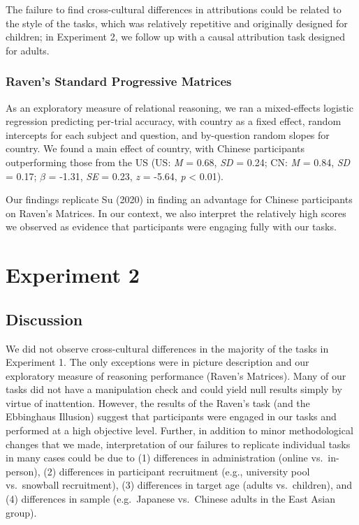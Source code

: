 \documentclass[
  man,floatsintext]{apa6}
\begin{document}
The failure to find cross-cultural differences in attributions could be related to the style of the tasks, which was relatively repetitive and originally designed for children; in Experiment 2, we follow up with a causal attribution task designed for adults.

\hypertarget{ravens-standard-progressive-matrices-1}{%
\subsubsection{Raven's Standard Progressive Matrices}\label{ravens-standard-progressive-matrices-1}}

As an exploratory measure of relational reasoning, we ran a mixed-effects logistic regression predicting per-trial accuracy, with country as a fixed effect, random intercepts for each subject and question, and by-question random slopes for country. We found a main effect of country, with Chinese participants outperforming those from the US (US: \emph{M} = 0.68, \emph{SD} = 0.24; CN: \emph{M} = 0.84, \emph{SD} = 0.17; \(\beta\) = -1.31, \emph{SE} = 0.23, \emph{z} = -5.64, \emph{p} \textless{} 0.01).

Our findings replicate Su (2020) in finding an advantage for Chinese participants on Raven's Matrices. In our context, we also interpret the relatively high scores we observed as evidence that participants were engaging fully with our tasks.

\hypertarget{experiment-2}{%
\section{Experiment 2}\label{experiment-2}}

\hypertarget{discussion}{%
\subsection{Discussion}\label{discussion}}

We did not observe cross-cultural differences in the majority of the tasks in Experiment 1. The only exceptions were in picture description and our exploratory measure of reasoning performance (Raven's Matrices). Many of our tasks did not have a manipulation check and could yield null results simply by virtue of inattention. However, the results of the Raven's task (and the Ebbinghaus Illusion) suggest that participants were engaged in our tasks and performed at a high objective level. Further, in addition to minor methodological changes that we made, interpretation of our failures to replicate individual tasks in many cases could be due to (1) differences in administration (online vs.~in-person), (2) differences in participant recruitment (e.g., university pool vs.~snowball recruitment), (3) differences in target age (adults vs.~children), and (4) differences in sample (e.g.~Japanese vs.~Chinese adults in the East Asian group).
\end{document}
